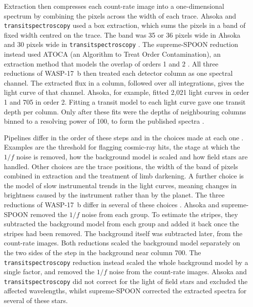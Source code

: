 Extraction then compresses each count-rate image into a one-dimensional
spectrum by combining the pixels across the width of each trace. Ahsoka and
\texttt{transitspectroscopy} used a box extraction, which sums the pixels in a
band of fixed width centred on the trace. The band was 35 or 36 pixels wide in
Ahsoka and 30 pixels wide in \texttt{transitspectroscopy}
\citep{LouieEtAl2025}. The supreme-SPOON reduction instead used ATOCA (an
Algorithm to Treat Order Contamination), an extraction method that models the
overlap of orders 1 and 2 \citep{DarveauBernierEtAl2022,LouieEtAl2025}. All
three reductions of WASP-17~b then treated each detector column as one
spectral channel. The extracted flux in a column, followed over all
integrations, gives the light curve of that channel. Ahsoka, for example,
fitted 2,021 light curves in order 1 and 705 in order 2. Fitting a transit
model to each light curve gave one transit depth per column. Only after these
fits were the depths of neighbouring columns binned to a resolving power of
100, to form the published spectra \citep{LouieEtAl2025}.

Pipelines differ in the order of these steps and in the choices made at each
one \citep{RadicaEtAl2023,HolmbergMadhusudhan2023,LouieEtAl2025}. Examples are
the threshold for flagging cosmic-ray hits, the stage at which the $1/f$ noise
is removed, how the background model is scaled and how field stars are
handled. Other choices are the trace positions, the width of the band of
pixels combined in extraction and the treatment of limb darkening. A further
choice is the model of slow instrumental trends in the light curves, meaning
changes in brightness caused by the instrument rather than by the planet. The
three reductions of WASP-17~b differ in several of these choices
\citep{LouieEtAl2025}. Ahsoka and supreme-SPOON removed the $1/f$ noise from
each group. To estimate the stripes, they subtracted the background model from each group and added it back once the stripes had been removed. The background itself was subtracted later, from the count-rate images. Both reductions scaled the background model separately on the two sides of the
step in the background near column 700. The \texttt{transitspectroscopy}
reduction instead scaled the whole background model by a single factor, and removed
the $1/f$ noise from the count-rate images. Ahsoka and
\texttt{transitspectroscopy} did not correct for the light of field stars and
excluded the affected wavelengths, whilst supreme-SPOON corrected the
extracted spectra for several of these stars.

